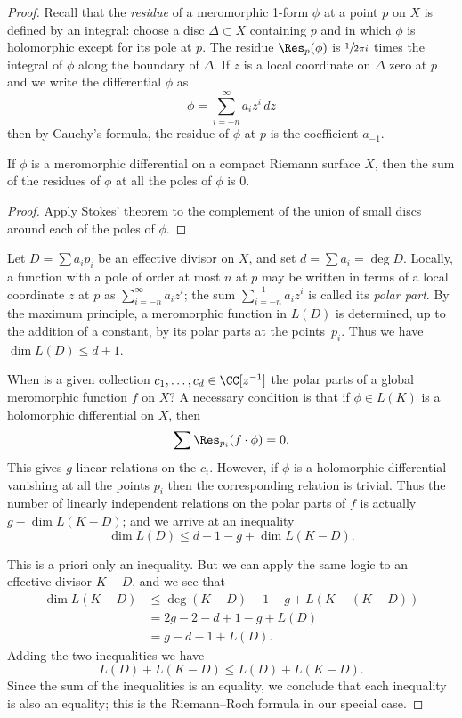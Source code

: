 \begin{proof}
Recall that the 
\emph{residue}
of a meromorphic 1-form $\phi$ at a
%
point $p$ on $X$ is defined by an integral: choose a disc $\Delta \subset X$ containing $p$ and in which $\phi$ is holomorphic except
for its pole at $p$. The residue $\Res_p(\phi)$ is $\sfrac{1}{2\pi i}$
times the integral of $\phi$ along the boundary of $\Delta$. If $z$ is
a local coordinate on $\Delta$ zero at $p$ and we write the
differential $\phi$ as
{\meshing
$$
\phi = \sum_{i=-n}^\infty \!a_iz^i \,dz
$$
then by Cauchy's formula, the residue of $\phi$ at $p$ is the coefficient $a_{-1}$. 
}

\begin{proposition}\label{residue sum}
 If $\phi$ is a meromorphic differential on a compact Riemann surface $X$, then the sum of the residues of $\phi$
 at all the poles of $\phi$ is $0$.
\unif
 \end{proposition}
 
\begin{proof}
Apply 
Stokes' theorem
%
to the complement of the union of small discs around each of the poles of $\phi$.
\end{proof}

Let  $D = \sum a_ip_i$ be an effective divisor on $X$, and set $d = \sum a_i = \deg D$. Locally, a function with a pole of order at most $n$ at $p$ may be written in terms of a local coordinate $z$ at $p$ as $\sum_{i=-n}^\infty a_{i}z^{i} $;
the sum $\sum_{i=-n}^{-1} a_{i}z^{i}$ is called its \emph{polar part}.
By the maximum principle, a meromorphic function in $L(D)$ is determined, up to the addition of a constant, by its polar parts at the points~$p_i$. Thus we have $\dim L(D) \leq d+1$.
{\meshing\par}

When is a given collection $c_1,\dots,c_d \in \CC[z^{-1}]$ the polar parts of a global meromorphic function $f$ on $X$? A necessary condition
is that if $\phi \in L(K)$ is a holomorphic differential on $X$, then
$$
\sum \Res_{p_i}(f \cdot \phi) = 0.
$$
This gives $g$ linear relations on the $c_i$. However, if $\phi$ is a holomorphic differential vanishing at all the points $p_i$
then the corresponding relation is trivial. Thus the number of linearly independent relations on the polar parts of $f$ is actually $g - \dim L(K-D)$; and we arrive at an inequality
$$
\dim L(D) \leq d + 1 - g + \dim L(K-D).
$$

This is a priori only an inequality. But we can apply the same logic to an effective divisor $K-D$, and we see that
\begin{align*}
\dim L(K-D) &\leq \deg(K-D) + 1 - g + L(K - (K-D)) \\
& = 2g - 2 - d + 1 - g  + L(D) \\
&= g - d - 1 + L(D).
\end{align*}
Adding the two inequalities we have
$$
L(D) + L(K-D) \leq L(D) + L(K-D).
$$
Since the sum of the inequalities is an equality, we conclude that each inequality is also an equality; this is the Riemann--Roch formula
in our special case.
\end{proof}

